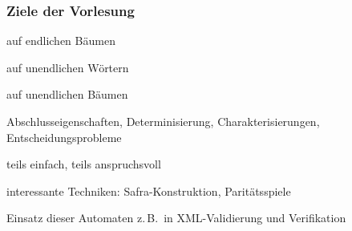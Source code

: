     \begin{frame}
      \frametitle{Ziele der Vorlesung}
      
      \begin{Itemize}
        \item
          auf endlichen Bäumen
        \item
          auf unendlichen Wörtern
        \item
          auf unendlichen Bäumen
      \end{Itemize}
    
      \par\bigskip
      \begin{Itemize}
        \item
          Abschlusseigenschaften, Determinisierung, Charakterisierungen, Entscheidungsprobleme
        \item
          teils einfach, teils anspruchsvoll
        \item
          interessante Techniken: Safra-Konstruktion, Paritätsspiele
      \end{Itemize}
      
      \par\bigskip
      \par\smallskip
      Einsatz dieser Automaten z.\,B.\ in XML-Validierung und Verifikation

    \end{frame}

